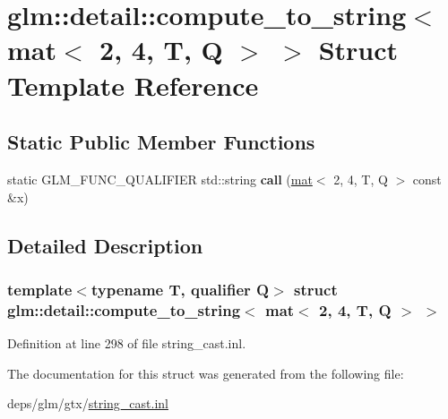 \hypertarget{structglm_1_1detail_1_1compute__to__string_3_01mat_3_012_00_014_00_01T_00_01Q_01_4_01_4}{}\section{glm\+:\+:detail\+:\+:compute\+\_\+to\+\_\+string$<$ mat$<$ 2, 4, T, Q $>$ $>$ Struct Template Reference}
\label{structglm_1_1detail_1_1compute__to__string_3_01mat_3_012_00_014_00_01T_00_01Q_01_4_01_4}
\subsection*{Static Public Member Functions}
\begin{DoxyCompactItemize}
\item 
\mbox{\label{structglm_1_1detail_1_1compute__to__string_3_01mat_3_012_00_014_00_01T_00_01Q_01_4_01_4_a33aa32e523377e9a404a6eb7b4048e76}} 
static G\+L\+M\+\_\+\+F\+U\+N\+C\+\_\+\+Q\+U\+A\+L\+I\+F\+I\+ER std\+::string {\bfseries call} (\hyperlink{structglm_1_1mat}{mat}$<$ 2, 4, T, Q $>$ const \&x)
\end{DoxyCompactItemize}


\subsection{Detailed Description}
\subsubsection*{template$<$typename T, qualifier Q$>$\newline
struct glm\+::detail\+::compute\+\_\+to\+\_\+string$<$ mat$<$ 2, 4, T, Q $>$ $>$}



Definition at line 298 of file string\+\_\+cast.\+inl.



The documentation for this struct was generated from the following file\+:\begin{DoxyCompactItemize}
\item 
deps/glm/gtx/\hyperlink{string__cast_8inl}{string\+\_\+cast.\+inl}\end{DoxyCompactItemize}
